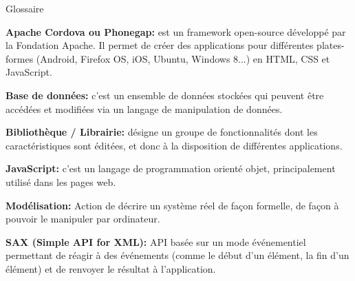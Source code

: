 {\Huge{Glossaire}}

\vspace{2.5cm}

{\bfseries Apache Cordova ou Phonegap:} est un framework open-source développé par la Fondation Apache. Il permet de créer des applications pour différentes plates-formes (Android, Firefox OS, iOS, Ubuntu, Windows 8...) en HTML, CSS et JavaScript.
\bigskip

{\bfseries Base de données:} c’est un ensemble de données stockées qui peuvent être accédées et modifiées via un langage de manipulation de données.
\bigskip

{\bfseries Bibliothèque / Librairie:} désigne un groupe de fonctionnalités dont les caractéristiques sont éditées, et donc à la disposition de différentes applications.
\bigskip

{\bfseries JavaScript:} c’est un langage de programmation orienté objet, principalement utilisé dans les pages web.
\bigskip

{\bfseries Modélisation:} Action de décrire un système réel de façon formelle, de façon à pouvoir le manipuler par ordinateur.
\bigskip

{\bfseries SAX (Simple API for XML):} API basée sur un mode événementiel permettant de réagir à des événements (comme le début d'un élément, la fin d'un élément) et de renvoyer le résultat à l'application.
\bigskip


